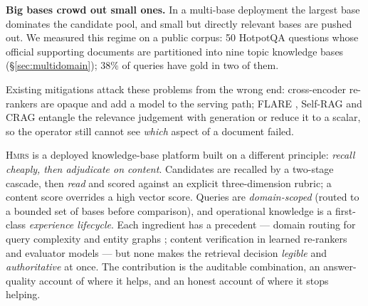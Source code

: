 \documentclass[sigconf, review, anonymous]{acmart}
\newcommand{\sys}{\textsc{Hmrs}}
\begin{document}
\noindent\textbf{Big bases crowd out small ones.} In a multi-base deployment the
largest base dominates the candidate pool, and small but directly relevant bases
are pushed out. We measured this regime on a public corpus: 50 HotpotQA
questions whose official supporting documents are partitioned into nine topic
knowledge bases (\S\ref{sec:multidomain}); $38\%$ of queries have gold in two
of them.

Existing mitigations attack these problems from the wrong end: cross-encoder
re-rankers are opaque and add a model to the serving path; FLARE
\cite{jiang2023flare}, Self-RAG \cite{asai2023selfrag} and CRAG
\cite{yan2024crag} entangle the relevance judgement with generation or reduce
it to a scalar, so the operator still cannot see \emph{which} aspect of a
document failed.

\sys{} is a deployed knowledge-base platform built on a different principle:
\emph{recall cheaply, then adjudicate on content}. Candidates are recalled by a
two-stage cascade, then \emph{read} and scored against an explicit
three-dimension rubric; a content score overrides a high vector score. Queries
are \emph{domain-scoped} (routed to a bounded set of bases before comparison),
and operational knowledge is a first-class \emph{experience lifecycle}. Each
ingredient has a precedent --- domain routing for query complexity
\cite{jeong2024adaptiverag} and entity graphs
\cite{edge2024graphrag,huang2025hirag}; content verification in learned
re-rankers \cite{nogueira2019rerank} and evaluator models \cite{yan2024crag} ---
but none makes the retrieval decision \emph{legible} and \emph{authoritative}
at once. The contribution is the auditable combination, an answer-quality
account of where it helps, and an honest account of where it stops helping.
\end{document}
